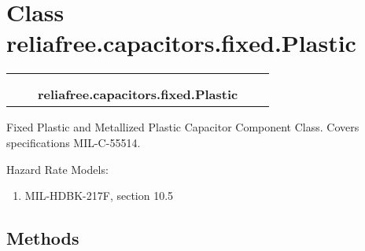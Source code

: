 %
%
%


\section{Class reliafree.capacitors.fixed.Plastic}

    \label{reliafree:capacitors:fixed:Plastic}
\begin{tabular}{cccccc}
\multicolumn{2}{r}{\settowidth{\BCL}{reliafree.capacitors.capacitor.Capacitor}\multirow{2}{\BCL}{reliafree.capacitors.capacitor.Capacitor}}
&&
  \\\cline{3-3}
  &&\multicolumn{1}{c|}{}
&&
  \\
&&\multicolumn{2}{l}{\textbf{reliafree.capacitors.fixed.Plastic}}
\end{tabular}

Fixed Plastic and Metallized Plastic Capacitor Component Class. Covers 
specifications MIL-C-55514.

Hazard Rate Models:

\begin{enumerate}

\setlength{\parskip}{0.5ex}
  \item MIL-HDBK-217F, section 10.5

\end{enumerate}



  \subsection{Methods}

    \vspace{0.5ex}

